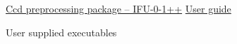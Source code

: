 \documentclass[twoside,a4paper,11pt]{article}
\begin{document}


\pagestyle{empty}

%
\pagestyle{empty}




\clearpage  
\pagestyle{myheadings}
\markboth
{\underline{Ccd preprocessing package -- IFU-0-1++}}   %
{\underline{User guide}} %
\vspace*{8 cm}
\newpage

%
%

%


%
\parskip=2mm
\newpage
{}
\setcounter{page}{1}



%
%   

%
\begin{section}{User supplied executables}
   
\end{section}

%
%   

%
%   
\end{document}
